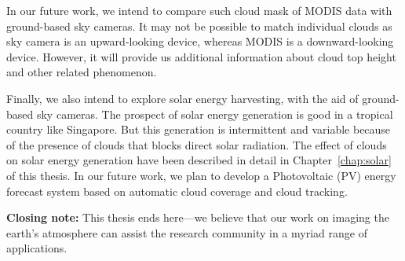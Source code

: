 In our future work, we intend to compare such cloud mask of MODIS data with ground-based sky cameras. It may not be possible to match individual clouds as sky camera is an upward-looking device, whereas MODIS is a downward-looking device. However, it will provide us additional information about cloud top height and other related phenomenon. 

Finally, we also intend to explore solar energy harvesting, with the aid of ground-based sky cameras. The prospect of solar energy generation is good in a tropical country like Singapore. But this generation is intermittent and variable because of the presence of clouds that blocks direct solar radiation. The effect of clouds on solar energy generation have been described in detail in Chapter~\ref{chap:solar} of this thesis. In our future work, we plan to develop a Photovoltaic (PV) energy forecast system based on automatic cloud coverage and cloud tracking.  

\textbf{Closing note:} This thesis ends here---we believe that our work on imaging the earth's atmosphere can assist the research community in a myriad range of applications. 


























